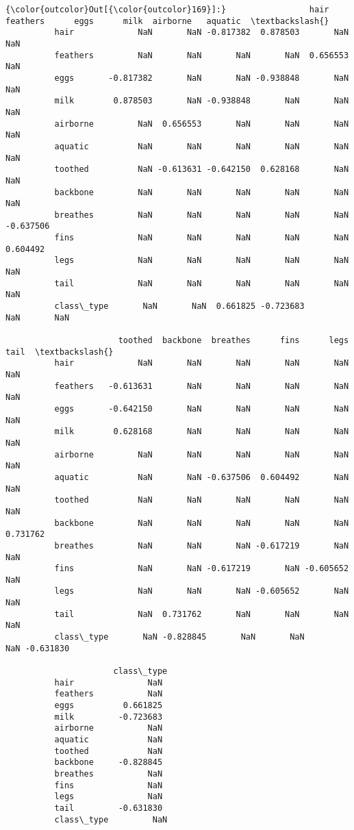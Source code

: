 \documentclass[11pt]{article}
\begin{document}
\begin{Verbatim}[commandchars=\\\{\}]
{\color{outcolor}Out[{\color{outcolor}169}]:}                 hair  feathers      eggs      milk  airborne   aquatic  \textbackslash{}
          hair             NaN       NaN -0.817382  0.878503       NaN       NaN   
          feathers         NaN       NaN       NaN       NaN  0.656553       NaN   
          eggs       -0.817382       NaN       NaN -0.938848       NaN       NaN   
          milk        0.878503       NaN -0.938848       NaN       NaN       NaN   
          airborne         NaN  0.656553       NaN       NaN       NaN       NaN   
          aquatic          NaN       NaN       NaN       NaN       NaN       NaN   
          toothed          NaN -0.613631 -0.642150  0.628168       NaN       NaN   
          backbone         NaN       NaN       NaN       NaN       NaN       NaN   
          breathes         NaN       NaN       NaN       NaN       NaN -0.637506   
          fins             NaN       NaN       NaN       NaN       NaN  0.604492   
          legs             NaN       NaN       NaN       NaN       NaN       NaN   
          tail             NaN       NaN       NaN       NaN       NaN       NaN   
          class\_type       NaN       NaN  0.661825 -0.723683       NaN       NaN   
          
                       toothed  backbone  breathes      fins      legs      tail  \textbackslash{}
          hair             NaN       NaN       NaN       NaN       NaN       NaN   
          feathers   -0.613631       NaN       NaN       NaN       NaN       NaN   
          eggs       -0.642150       NaN       NaN       NaN       NaN       NaN   
          milk        0.628168       NaN       NaN       NaN       NaN       NaN   
          airborne         NaN       NaN       NaN       NaN       NaN       NaN   
          aquatic          NaN       NaN -0.637506  0.604492       NaN       NaN   
          toothed          NaN       NaN       NaN       NaN       NaN       NaN   
          backbone         NaN       NaN       NaN       NaN       NaN  0.731762   
          breathes         NaN       NaN       NaN -0.617219       NaN       NaN   
          fins             NaN       NaN -0.617219       NaN -0.605652       NaN   
          legs             NaN       NaN       NaN -0.605652       NaN       NaN   
          tail             NaN  0.731762       NaN       NaN       NaN       NaN   
          class\_type       NaN -0.828845       NaN       NaN       NaN -0.631830   
          
                      class\_type  
          hair               NaN  
          feathers           NaN  
          eggs          0.661825  
          milk         -0.723683  
          airborne           NaN  
          aquatic            NaN  
          toothed            NaN  
          backbone     -0.828845  
          breathes           NaN  
          fins               NaN  
          legs               NaN  
          tail         -0.631830  
          class\_type         NaN  
\end{Verbatim}
            
\end{document}
